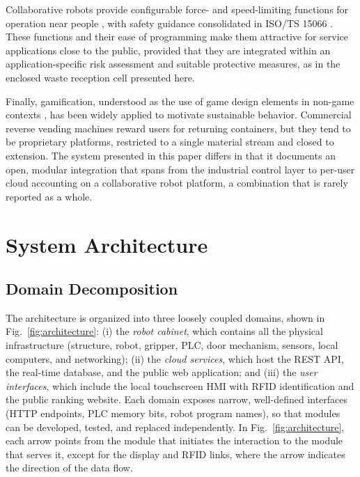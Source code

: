 ﻿\documentclass[conference]{IEEEtran}
\begin{document}
Collaborative robots provide configurable force- and speed-limiting functions for operation near people \cite{b10}, with safety guidance consolidated in ISO/TS 15066 \cite{b11}. These functions and their ease of programming make them attractive for service applications close to the public, provided that they are integrated within an application-specific risk assessment and suitable protective measures, as in the enclosed waste reception cell presented here.

Finally, gamification, understood as the use of game design elements in non-game contexts \cite{b12}, has been widely applied to motivate sustainable behavior. Commercial reverse vending machines reward users for returning containers, but they tend to be proprietary platforms, restricted to a single material stream and closed to extension. The system presented in this paper differs in that it documents an open, modular integration that spans from the industrial control layer to per-user cloud accounting on a collaborative robot platform, a combination that is rarely reported as a whole.

\section{System Architecture}
\subsection{Domain Decomposition}
The architecture is organized into three loosely coupled domains, shown in Fig.~\ref{fig:architecture}: (i) the \emph{robot cabinet}, which contains all the physical infrastructure (structure, robot, gripper, PLC, door mechanism, sensors, local computers, and networking); (ii) the \emph{cloud services}, which host the REST API, the real-time database, and the public web application; and (iii) the \emph{user interfaces}, which include the local touchscreen HMI with RFID identification and the public ranking website. Each domain exposes narrow, well-defined interfaces (HTTP endpoints, PLC memory bits, robot program names), so that modules can be developed, tested, and replaced independently. In Fig.~\ref{fig:architecture}, each arrow points from the module that initiates the interaction to the module that serves it, except for the display and RFID links, where the arrow indicates the direction of the data flow.
\end{document}
